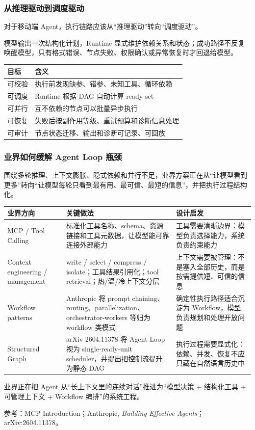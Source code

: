\documentclass[aspectratio=169]{ctexbeamer}
\begin{document}
\begin{frame}
  \frametitle{从推理驱动到调度驱动}
  对于移动端 Agent，执行链路应该从“推理驱动”转向“调度驱动”。

  \vspace{0.5em}
  模型输出一次结构化计划，Runtime 显式维护依赖关系和状态；成功路径不反复唤醒模型，只有格式错误、节点失败、权限确认或异常恢复时才回退给模型。

  \vspace{0.5em}
  \scriptsize
  \begin{tabularx}{\textwidth}{p{}Y}
    \toprule
    目标 & 含义 \\
    \midrule
    可校验 & 执行前发现缺参、错参、未知工具、循环依赖 \\
    可调度 & Runtime 根据 DAG 自动计算 ready set \\
    可并行 & 互不依赖的节点可以批量异步执行 \\
    可恢复 & 失败后按副作用等级、重试预算和诊断信息处理 \\
    可审计 & 节点状态迁移、输出和诊断可记录、可回放 \\
    \bottomrule
  \end{tabularx}
\end{frame}

\begin{frame}
  \frametitle{业界如何缓解 Agent Loop 瓶颈}
  围绕多轮推理、上下文膨胀、隐式依赖和并行不足，业界方案正在从“让模型看到更多”转向“让模型每轮只看到最有用、最可信、最短的信息”，并把执行过程结构化。

  \vspace{0.3em}
  \tiny
  \begin{tabularx}{\textwidth}{p{}Y Y}
    \toprule
    业界方向 & 关键做法 & 设计启发 \\
    \midrule
    MCP / Tool Calling & 标准化工具名称、schema、资源链接和工具元数据，让模型能可靠连接外部能力 & 工具需要清晰边界：模型负责选择能力，系统负责约束能力 \\
    Context engineering / management & write / select / compress / isolate；工具结果引用化；tool retrieval；热/温/冷上下文分层 & 上下文需要被管理：不是塞入全部历史，而是按需提供短、可信的信息 \\
    Workflow patterns & Anthropic 将 prompt chaining、routing、parallelization、orchestrator-workers 等归为 workflow 类模式 & 确定性执行路径适合沉淀为 Workflow，模型负责规划和处理开放问题 \\
    Structured Graph & arXiv 2604.11378 将 Agent Loop 视为 single-ready-unit scheduler，并提出把控制流提升为静态 DAG & 执行过程需要显式化：依赖、并发、恢复不应只藏在自然语言历史中 \\
    \bottomrule
  \end{tabularx}

  \vspace{0.45em}
  \footnotesize
  业界正在把 Agent 从“长上下文里的连续对话”推进为“模型决策 + 结构化工具 + 可管理上下文 + Workflow 编排”的系统工程。

  \vspace{0.3em}
  \tiny
  参考：MCP Introduction；Anthropic, \emph{Building Effective Agents}；arXiv:2604.11378。
\end{frame}
\end{document}
